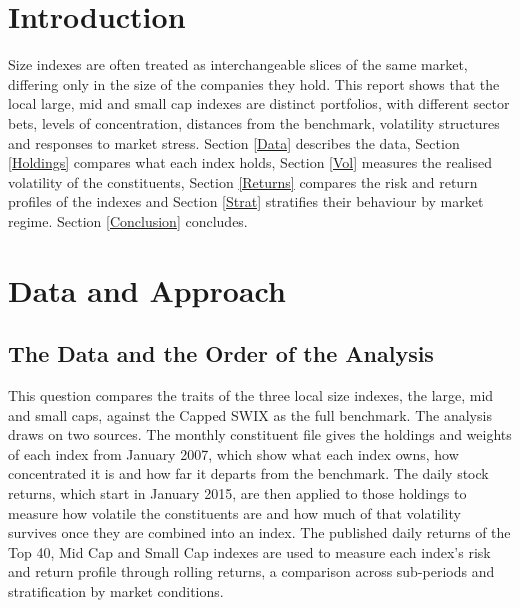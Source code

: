 \documentclass[11pt,preprint]{elsarticle}
\numberwithin{equation}{section}
\numberwithin{figure}{section}
\numberwithin{table}{section}
\begin{document}
\setcounter{footnote}{0}



\pagestyle{fancy}
\chead{}
\rhead{}
\lfoot{}
\lhead{}
\cfoot{}


\headsep 35pt %




\section{\texorpdfstring{Introduction
\label{Intro}}{Introduction }}\label{introduction}

Size indexes are often treated as interchangeable slices of the same
market, differing only in the size of the companies they hold. This
report shows that the local large, mid and small cap indexes are
distinct portfolios, with different sector bets, levels of
concentration, distances from the benchmark, volatility structures and
responses to market stress. Section \ref{Data} describes the data,
Section \ref{Holdings} compares what each index holds, Section \ref{Vol}
measures the realised volatility of the constituents, Section
\ref{Returns} compares the risk and return profiles of the indexes and
Section \ref{Strat} stratifies their behaviour by market regime. Section
\ref{Conclusion} concludes.

\section{\texorpdfstring{Data and Approach
\label{Data}}{Data and Approach }}\label{data-and-approach}

\subsection{The Data and the Order of the
Analysis}\label{the-data-and-the-order-of-the-analysis}

This question compares the traits of the three local size indexes, the
large, mid and small caps, against the Capped SWIX as the full
benchmark. The analysis draws on two sources. The monthly constituent
file gives the holdings and weights of each index from January 2007,
which show what each index owns, how concentrated it is and how far it
departs from the benchmark. The daily stock returns, which start in
January 2015, are then applied to those holdings to measure how volatile
the constituents are and how much of that volatility survives once they
are combined into an index. The published daily returns of the Top 40,
Mid Cap and Small Cap indexes are used to measure each index's risk and
return profile through rolling returns, a comparison across sub-periods
and stratification by market conditions.
\end{document}
